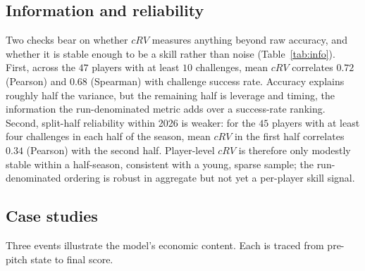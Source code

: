 

\subsection{Information and reliability}
Two checks bear on whether $cRV$ measures anything beyond raw accuracy, and
whether it is stable enough to be a skill rather than noise
(Table~\ref{tab:info}). First, across the $47$ players with at least $10$
challenges, mean $cRV$ correlates $0.72$ (Pearson) and $0.68$ (Spearman) with
challenge success rate. Accuracy explains roughly half the variance, but the
remaining half is leverage and timing, the information the run-denominated
metric adds over a success-rate ranking. Second, split-half reliability within
2026 is weaker: for the $45$ players with at least four challenges in each half
of the season, mean $cRV$ in the first half correlates $0.34$ (Pearson) with
the second half. Player-level $cRV$ is therefore only modestly stable within a
half-season, consistent with a young, sparse sample; the run-denominated
ordering is robust in aggregate but not yet a per-player skill signal.



\subsection{Case studies}
Three events illustrate the model's economic content. Each is traced from
pre-pitch state to final score.

